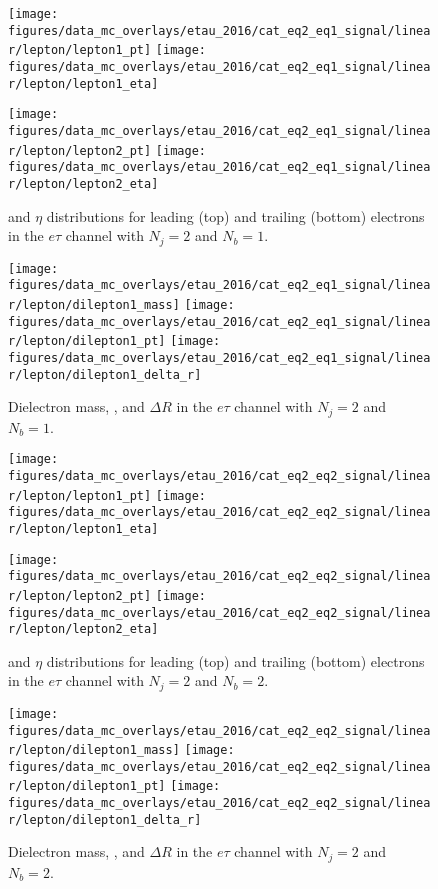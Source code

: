 \begin{figure}[htb!]
    \centering
    \texttt{[image: figures/data\_mc\_overlays/etau\_2016/cat\_eq2\_eq1\_signal/linear/lepton/lepton1\_pt]}
    \texttt{[image: figures/data\_mc\_overlays/etau\_2016/cat\_eq2\_eq1\_signal/linear/lepton/lepton1\_eta]}

    \texttt{[image: figures/data\_mc\_overlays/etau\_2016/cat\_eq2\_eq1\_signal/linear/lepton/lepton2\_pt]}
    \texttt{[image: figures/data\_mc\_overlays/etau\_2016/cat\_eq2\_eq1\_signal/linear/lepton/lepton2\_eta]}
    \caption{\pt and $\eta$ distributions for leading (top) and trailing
        (bottom) electrons in the $e\tau$ channel with $N_{j} = 2$ and
        $N_{b} = 1$.}
    \label{fig:etau_5_kinematic}
\end{figure}

\begin{figure}[htb!]
    \centering
    \texttt{[image: figures/data\_mc\_overlays/etau\_2016/cat\_eq2\_eq1\_signal/linear/lepton/dilepton1\_mass]}
    \texttt{[image: figures/data\_mc\_overlays/etau\_2016/cat\_eq2\_eq1\_signal/linear/lepton/dilepton1\_pt]}
    \texttt{[image: figures/data\_mc\_overlays/etau\_2016/cat\_eq2\_eq1\_signal/linear/lepton/dilepton1\_delta\_r]}
    \caption{Dielectron mass, \pt, and $\Delta R$ in the $e\tau$ channel
    with $N_{j} = 2$ and $N_{b} = 1$.}
    \label{fig:etau_5_dilepton}
\end{figure}

\begin{figure}[htb!]
    \centering
    \texttt{[image: figures/data\_mc\_overlays/etau\_2016/cat\_eq2\_eq2\_signal/linear/lepton/lepton1\_pt]}
    \texttt{[image: figures/data\_mc\_overlays/etau\_2016/cat\_eq2\_eq2\_signal/linear/lepton/lepton1\_eta]}

    \texttt{[image: figures/data\_mc\_overlays/etau\_2016/cat\_eq2\_eq2\_signal/linear/lepton/lepton2\_pt]}
    \texttt{[image: figures/data\_mc\_overlays/etau\_2016/cat\_eq2\_eq2\_signal/linear/lepton/lepton2\_eta]}
    \caption{\pt and $\eta$ distributions for leading (top) and trailing
        (bottom) electrons in the $e\tau$ channel with $N_{j} = 2$ and
        $N_{b} = 2$.}
    \label{fig:etau_6_kinematic}
\end{figure}

\begin{figure}[htb!]
    \centering
    \texttt{[image: figures/data\_mc\_overlays/etau\_2016/cat\_eq2\_eq2\_signal/linear/lepton/dilepton1\_mass]}
    \texttt{[image: figures/data\_mc\_overlays/etau\_2016/cat\_eq2\_eq2\_signal/linear/lepton/dilepton1\_pt]}
    \texttt{[image: figures/data\_mc\_overlays/etau\_2016/cat\_eq2\_eq2\_signal/linear/lepton/dilepton1\_delta\_r]}
    \caption{Dielectron mass, \pt, and $\Delta R$ in the $e\tau$ channel
    with $N_{j} = 2$ and $N_{b} = 2$.}
    \label{fig:etau_6_dilepton}
\end{figure}

